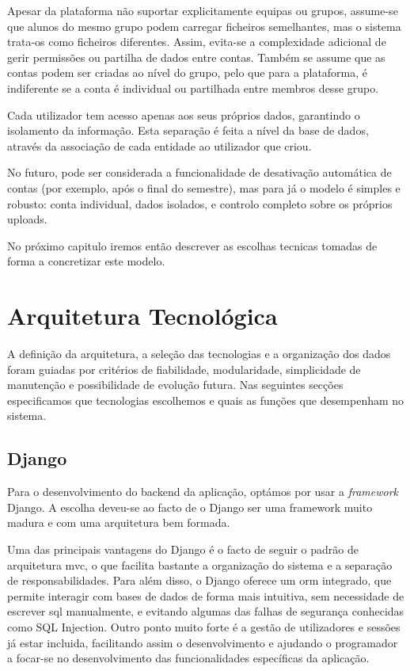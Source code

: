 Apesar da plataforma não suportar explicitamente equipas ou grupos, assume-se que alunos do mesmo grupo podem carregar ficheiros semelhantes, mas o sistema trata-os como ficheiros diferentes. Assim, evita-se a complexidade adicional de gerir permissões ou partilha de dados entre contas. Também se assume que as contas podem ser criadas ao nível do grupo, pelo que para a plataforma, é indiferente se a conta é individual ou partilhada entre membros desse grupo.

Cada utilizador tem acesso apenas aos seus próprios dados, garantindo o isolamento da informação. Esta separação é feita a nível da base de dados, através da associação de cada entidade ao utilizador que criou.

No futuro, pode ser considerada a funcionalidade de desativação automática de contas (por exemplo, após o final do semestre), mas para já o modelo é simples e robusto: conta individual, dados isolados, e controlo completo sobre os próprios uploads.

No próximo capitulo iremos então descrever as escolhas tecnicas tomadas de forma a concretizar este modelo.


\section{Arquitetura Tecnológica}
\label{sec:tec}

A definição da arquitetura, a seleção das tecnologias e a organização dos dados foram guiadas por critérios de fiabilidade, modularidade, simplicidade de manutenção e possibilidade de evolução futura.  Nas seguintes secções especificamos que tecnologias escolhemos e quais as funções que desempenham no sistema.

\subsection{Django}

Para o desenvolvimento do backend da aplicação, optámos por usar a \textit{framework} Django. A escolha deveu-se ao facto  de o Django ser uma framework muito madura e com uma arquitetura bem formada.

Uma das principais vantagens do Django é o facto de seguir o padrão de arquitetura \gls{mvc}, o que facilita bastante a organização do sistema e a separação de responsabilidades. Para além disso, o Django oferece um \gls{orm} integrado, que permite interagir com bases de dados de forma mais intuitiva, sem necessidade de escrever \gls{sql} manualmente, e evitando algumas das falhas de segurança conhecidas como SQL Injection. Outro ponto muito forte é a gestão de utilizadores e sessões já estar incluida, facilitando assim o desenvolvimento e ajudando o programador a focar-se no desenvolvimento das funcionalidades específicas da aplicação.


